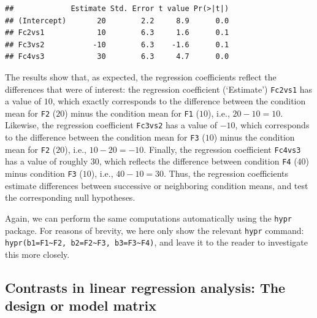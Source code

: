 \documentclass[12pt,]{krantz}
\newenvironment{Shaded}{\begin{snugshade}}{\end{snugshade}}
\newcommand{\DecValTok}[1]{\textcolor[rgb]{0.00,0.00,0.81}{#1}}
\newcommand{\KeywordTok}[1]{\textcolor[rgb]{0.13,0.29,0.53}{\textbf{#1}}}
\newcommand{\NormalTok}[1]{#1}
\newcommand{\OperatorTok}[1]{\textcolor[rgb]{0.81,0.36,0.00}{\textbf{#1}}}
\begin{document}
\begin{Shaded}
\end{Shaded}

\begin{verbatim}
##             Estimate Std. Error t value Pr(>|t|)
## (Intercept)       20        2.2     8.9      0.0
## Fc2vs1            10        6.3     1.6      0.1
## Fc3vs2           -10        6.3    -1.6      0.1
## Fc4vs3            30        6.3     4.7      0.0
\end{verbatim}

The results show that, as expected, the regression coefficients reflect the differences that were of interest: the regression coefficient (`Estimate') \texttt{Fc2vs1} has a value of \(10\), which exactly corresponds to the difference between the condition mean for \texttt{F2} (\(20\)) minus the condition mean for \texttt{F1} (\(10\)), i.e., \(20 - 10 = 10\). Likewise, the regression coefficient \texttt{Fc3vs2} has a value of \(-10\), which corresponds to the difference between the condition mean for \texttt{F3} (\(10\)) minus the condition mean for \texttt{F2} (\(20\)), i.e., \(10 - 20 = -10\). Finally, the regression coefficient \texttt{Fc4vs3} has a value of roughly \(30\), which reflects the difference between condition \texttt{F4} (\(40\)) minus condition \texttt{F3} (\(10\)), i.e., \(40 - 10 = 30\). Thus, the regression coefficients estimate differences between successive or neighboring condition means, and test the corresponding null hypotheses.

Again, we can perform the same computations automatically using the \texttt{hypr} package. For reasons of brevity, we here only show the relevant \texttt{hypr} command: \texttt{hypr(b1=F1\textasciitilde{}F2,\ b2=F2\textasciitilde{}F3,\ b3=F3\textasciitilde{}F4)}, and leave it to the reader to investigate this more closely.

\hypertarget{contrasts-in-linear-regression-analysis-the-design-or-model-matrix}{%
\subsection{Contrasts in linear regression analysis: The design or model matrix}\label{contrasts-in-linear-regression-analysis-the-design-or-model-matrix}}
\end{document}
